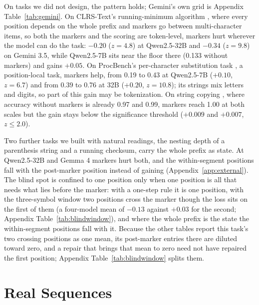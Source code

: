 \documentclass[10pt]{article} %
\begin{document}
On tasks we did not design, the pattern holds; Gemini's own grid is Appendix Table~\ref{tab:gemini}. On CLRS-Text's running-minimum algorithm \citep{markeeva2024clrstext}, where every position depends on the whole prefix and markers go between multi-character items, so both the markers and the scoring are token-level, markers hurt wherever the model can do the task: $-0.20$ ($z = 4.8$) at Qwen2.5-32B and $-0.34$ ($z = 9.8$) on Gemini 3.5, while Qwen2.5-7B sits near the floor there (0.133 without markers) and gains $+0.05$. On ProcBench's per-character substitution task \citep{fujisawa2024procbench}, a position-local task, markers help, from 0.19 to 0.43 at Qwen2.5-7B ($+0.10$, $z = 6.7$) and from 0.39 to 0.76 at 32B ($+0.20$, $z = 10.8$); its strings mix letters and digits, so part of this gain may be tokenization. On string copying \citep{jelassi2024repeat}, where accuracy without markers is already 0.97 and 0.99, markers reach 1.00 at both scales but the gain stays below the significance threshold ($+0.009$ and $+0.007$, $z \le 2.0$).

Two further tasks we built with natural readings, the nesting depth of a parenthesis string and a running checksum, carry the whole prefix as state. At Qwen2.5-32B and Gemma 4 markers hurt both, and the within-segment positions fall with the post-marker position instead of gaining (Appendix~\ref{app:external}). The blind spot is confined to one position only when one position is all that needs what lies before the marker: with a one-step rule it is one position, with the three-symbol window two positions cross the marker though the loss sits on the first of them (a four-model mean of $-0.13$ against $+0.03$ for the second; Appendix Table~\ref{tab:blindwindow}), and where the whole prefix is the state the within-segment positions fall with it. Because the other tables report this task's two crossing positions as one mean, its post-marker entries there are diluted toward zero, and a repair that brings that mean to zero need not have repaired the first position; Appendix Table~\ref{tab:blindwindow} splits them.

\section{Real Sequences}
\label{sec:real}
\end{document}
